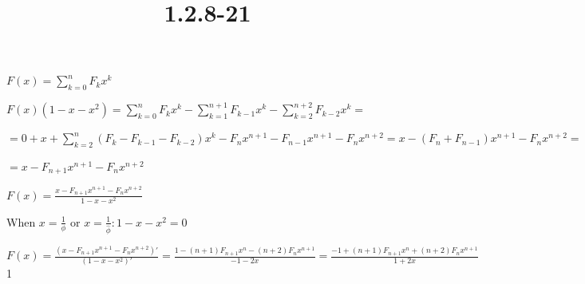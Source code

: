\documentclass{article}
\title{1.2.8-21}
\begin{document}
\maketitle

\( F(x) = \sum_{k=0}^n F_kx^k \)

\( F(x)(1-x-x^2) = \sum_{k=0}^n F_kx^k - \sum_{k=1}^{n+1} F_{k-1}x^k - \sum_{k=2}^{n+2} F_{k-2}x^k = \)

\( = 0 + x + \sum_{k=2}^n(F_k - F_{k-1}-F_{k-2})x^k - F_{n}x^{n+1} - F_{n-1}x^{n+1} - F_nx^{n+2} = x - (F_n+F_{n-1})x^{n+1} - F_nx^{n+2} = \)

\( = x - F_{n+1}x^{n+1} - F_nx^{n+2} \)

\( F(x) = \frac{x-F_{n+1}x^{n+1}-F_nx^{n+2}}{1-x-x^2} \)

When \( x = \frac{1}{\phi} \) or \( x = \frac{1}{\hat\phi}: 1-x-x^2 = 0 \)

\( F(x) = \frac{(x-F_{n+1}x^{n+1}-F_nx^{n+2})'}{(1-x-x^2)'} = \frac{1-(n+1)F_{n+1}x^n -(n+2)F_nx^{n+1}}{-1-2x} = \frac{-1+(n+1)F_{n+1}x^n+(n+2)F_nx^{n+1}}{1+2x} \)
1
\end{document}
